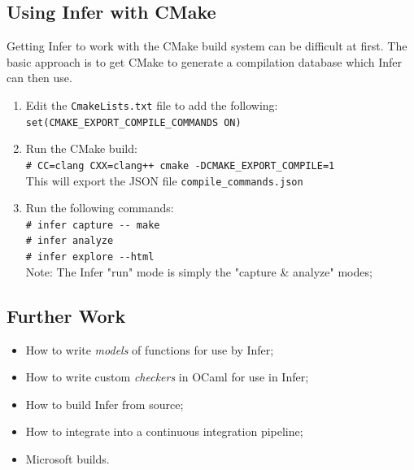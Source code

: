\subsection{Using Infer with CMake}

Getting Infer to work with the CMake build system can be difficult at first.
The basic approach is to get CMake to generate a compilation database
which Infer can then use.

\begin{enumerate}
	\item Edit the \verb|CmakeLists.txt| file to add the following:\\
	\verb|set(CMAKE_EXPORT_COMPILE_COMMANDS ON)|
	\item Run the CMake build:\\
	\verb|# CC=clang CXX=clang++ cmake -DCMAKE_EXPORT_COMPILE=1|\\
	This will export the JSON file  \verb|compile_commands.json|
	\item Run the following commands:\\
	\verb|# infer capture -- make|\\
	\verb|# infer analyze|\\
	\verb|# infer explore --html|\\
	Note: The Infer "run" mode is simply the "capture \& analyze" modes;
	
\end{enumerate}

\subsection{Further Work}
\begin{itemize}
	\item How to write \textit{models} of functions for use by Infer;
	\item How to write custom \textit{checkers} in OCaml for use in Infer;
	\item How to build Infer from source;
	\item How to integrate into a continuous integration pipeline;
	\item Microsoft builds.
\end{itemize}
